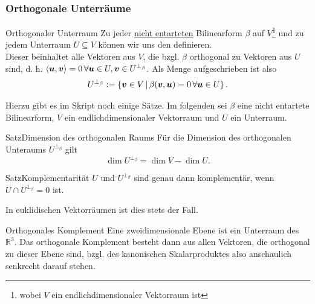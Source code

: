 \subsubsection{Orthogonale Unterräume}
\begin{Def}
{Orthogonaler Unterraum}
Zu jeder \underline{nicht entarteten} Bilinearform $\beta$ auf $V$\footnote{wobei $V$ ein endlichdimensionaler Vektorraum ist} und zu jedem Unterraum $U\subseteq V$ können wir uns den  definieren.\\
Dieser beinhaltet alle Vektoren aus $V$, die bzgl. $\beta$ orthogonal zu Vektoren aus $U$ sind, d. h. $\left\langle{{\text{\boldmath${u}$}}},{{\text{\boldmath${v}$}}}\right\rangle=0\,\forall {{\text{\boldmath${u}$}}}\in U, {{\text{\boldmath${v}$}}}\in U^{\perp_\beta}$. Als Menge aufgeschrieben ist also
\begin{equation*}
U^{\perp_\beta}:=\left\{{{\text{\boldmath${v}$}}}\in V\,|\,\beta({{\text{\boldmath${v}$}}},{{\text{\boldmath${u}$}}})=0\,\forall {{\text{\boldmath${u}$}}}\in U\right\}.
\end{equation*}
\end{Def}

Hierzu gibt es im Skript noch einige Sätze. Im folgenden sei $\beta$ eine nicht entartete Bilinearform, $V$ ein endlichdimensionaler Vektorraum und $U$ ein Unterraum.
\begin{Satz}{Satz}{Dimension des orthogonalen Raums}
Für die Dimension des orthogonalen Unteraums $U^{\perp_\beta}$ gilt
\begin{equation}
\dim U^{\perp_\beta}=\dim V- \dim U.
\end{equation}
\end{Satz}
\begin{Satz}
{Satz}{Komplementarität}
$U$ und $U^{\perp_\beta}$ sind genau dann komplementär, wenn $U\cap U^{\perp_\beta}=0$ ist.\\
\end{Satz}
In euklidischen Vektorräumen ist dies stets der Fall.
\begin{Beispiel}
{Orthogonales Komplement}
Eine zweidimensionale Ebene ist ein Unterraum des $\mathbb{R}^3$. Das orthogonale Komplement besteht dann aus allen Vektoren, die orthogonal zu dieser Ebene sind, bzgl. des kanonischen Skalarproduktes also anschaulich senkrecht darauf stehen.
\end{Beispiel}


